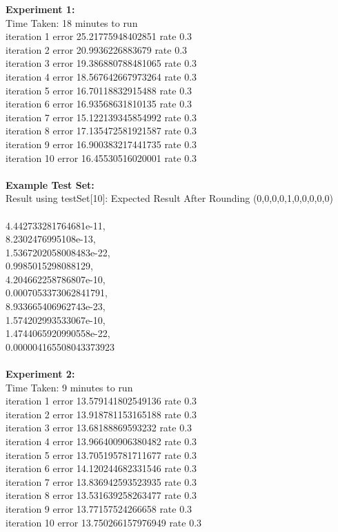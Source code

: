 \documentclass[11pt]{article}
\begin{document}
\begin{page}
\noindent \textbf{Experiment 1:} \\
Time Taken: 18 minutes to run\\

\noindent iteration 1 error 25.21775948402851 rate 0.3\\
iteration 2 error 20.9936226883679 rate 0.3\\
iteration 3 error 19.386880788481065 rate 0.3\\
iteration 4 error 18.567642667973264 rate 0.3\\
iteration 5 error 16.70118832915488 rate 0.3\\
iteration 6 error 16.93568631810135 rate 0.3\\
iteration 7 error 15.122139345854992 rate 0.3\\
iteration 8 error 17.135472581921587 rate 0.3\\
iteration 9 error 16.900383217441735 rate 0.3\\
iteration 10 error 16.45530516020001 rate 0.3\\\\

\noindent \textbf{Example Test Set:}\\
Result using testSet[10]: Expected Result After Rounding (0,0,0,0,1,0,0,0,0,0)\\\\

\noindent 4.442733281764681e-11,\\
  8.2302476995108e-13,\\
  1.5367202058008483e-22,\\
  0.9985015298088129,\\
  4.204662258786807e-10,\\
  0.0007053373062841791,\\
  8.933665406962743e-23,\\
  1.574202993533067e-10,\\
  1.4744065920990558e-22,\\
  0.000004165508043373923\\
\\
\noindent \textbf{Experiment 2:} \\
Time Taken: 9 minutes to run\\

\noindent iteration 1 error 13.579141802549136 rate 0.3\\
iteration 2 error 13.918781153165188 rate 0.3\\
iteration 3 error 13.68188869593232 rate 0.3\\
iteration 4 error 13.966400906380482 rate 0.3\\
iteration 5 error 13.705195781711677 rate 0.3\\
iteration 6 error 14.120244682331546 rate 0.3\\
iteration 7 error 13.836942593523935 rate 0.3\\
iteration 8 error 13.531639258263477 rate 0.3\\
iteration 9 error 13.77157524266658 rate 0.3\\
iteration 10 error 13.750266157976949 rate 0.3\\\\


\end{page}
\end{document}
